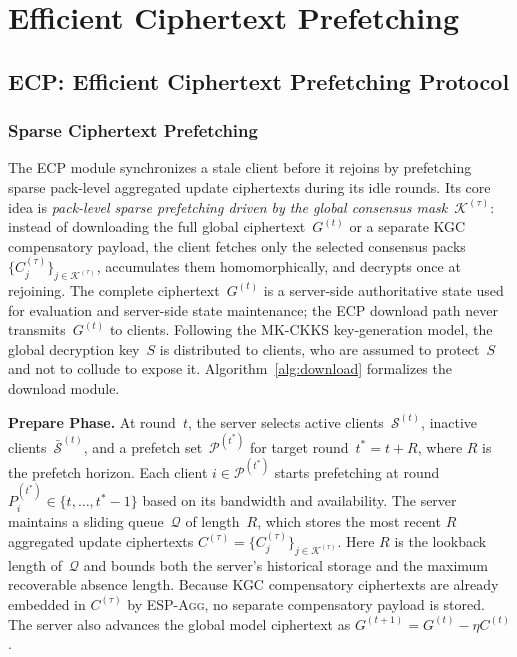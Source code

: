 \documentclass[10pt,conference]{IEEEtran}
\begin{document}
\section{Efficient Ciphertext Prefetching}
\label{sec:ecp}

\subsection{ECP: Efficient Ciphertext Prefetching Protocol}
\label{sec:cipherfetch}

\subsubsection{Sparse Ciphertext Prefetching}
\label{sssec:sparse-prefetch}

The \textsc{ECP} module synchronizes a stale client before it rejoins by prefetching sparse pack-level aggregated update ciphertexts during its idle rounds.
Its core idea is \emph{pack-level sparse prefetching driven by the global consensus mask}~$\mathcal{K}^{(\tau)}$: instead of downloading the full global ciphertext~$G^{(t)}$ or a separate KGC compensatory payload, the client fetches only the selected consensus packs~$\{C_j^{(\tau)}\}_{j\in\mathcal{K}^{(\tau)}}$, accumulates them homomorphically, and decrypts once at rejoining.
The complete ciphertext~$G^{(t)}$ is a server-side authoritative state used for evaluation and server-side state maintenance; the ECP download path never transmits~$G^{(t)}$ to clients.
Following the MK-CKKS key-generation model, the global decryption key~$S$ is distributed to clients, who are assumed to protect~$S$ and not to collude to expose it.
Algorithm~\ref{alg:download} formalizes the download module.

\textbf{Prepare Phase.}
At round~$t$, the server selects active clients~$\mathcal{S}^{(t)}$, inactive clients~$\bar{\mathcal{S}}^{(t)}$, and a prefetch set~$\mathcal{P}^{(t^*)}$ for target round~$t^*=t+R$, where $R$ is the prefetch horizon.
Each client $i\in\mathcal{P}^{(t^*)}$ starts prefetching at round $P_i^{(t^*)}\in\{t,\dots,t^*-1\}$ based on its bandwidth and availability.
The server maintains a sliding queue~$\mathcal{Q}$ of length~$R$, which stores the most recent $R$ aggregated update ciphertexts $C^{(\tau)}=\{C_j^{(\tau)}\}_{j\in\mathcal{K}^{(\tau)}}$.
Here $R$ is the lookback length of~$\mathcal{Q}$ and bounds both the server's historical storage and the maximum recoverable absence length.
Because KGC compensatory ciphertexts are already embedded in $C^{(\tau)}$ by \textsc{ESP-Agg}, no separate compensatory payload is stored.
The server also advances the global model ciphertext as $G^{(t+1)}=G^{(t)}-\eta C^{(t)}$.
\end{document}
